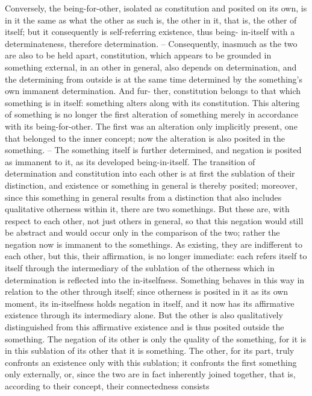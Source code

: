 Conversely, the being-for-other, isolated as constitution and posited on its
own, is in it the same as what the other as such is, the other in it, that is,
the other of itself; but it consequently is self-referring existence, thus being-
in-itself with a determinateness, therefore determination. – Consequently,
inasmuch as the two are also to be held apart, constitution, which appears
to be grounded in something external, in an other in general, also depends
on determination, and the determining from outside is at the same time
determined by the something’s own immanent determination. And fur-
ther, constitution belongs to that which something is in itself: something
alters along with its constitution.
This altering of something is no longer the first alteration of something
merely in accordance with its being-for-other. The first was an alteration
only implicitly present, one that belonged to the inner concept; now the
alteration is also posited in the something. – The something itself is further
determined, and negation is posited as immanent to it, as its developed
being-in-itself.
The transition of determination and constitution into each other is at
first the sublation of their distinction, and existence or something in general
is thereby posited; moreover, since this something in general results from a
distinction that also includes qualitative otherness within it, there are two
somethings. But these are, with respect to each other, not just others in
general, so that this negation would still be abstract and would occur only
in the comparison of the two; rather the negation now is immanent to the
somethings. As existing, they are indifferent to each other, but this, their
affirmation, is no longer immediate: each refers itself to itself through the
intermediary of the sublation of the otherness which in determination is
reflected into the in-itselfness.
Something behaves in this way in relation to the other through itself;
since otherness is posited in it as its own moment, its in-itselfness holds
negation in itself, and it now has its affirmative existence through its
intermediary alone. But the other is also qualitatively distinguished from
this affirmative existence and is thus posited outside the something. The
negation of its other is only the quality of the something, for it is in
this sublation of its other that it is something. The other, for its part,
truly confronts an existence only with this sublation; it confronts the first
something only externally, or, since the two are in fact inherently joined
together, that is, according to their concept, their connectedness consists
